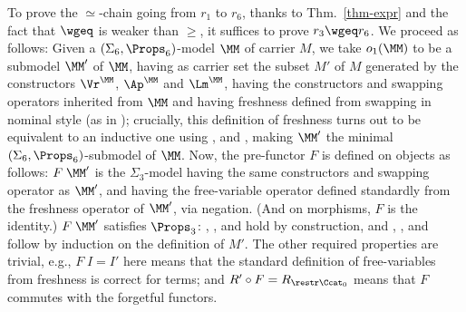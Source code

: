 To prove the $\simeq$-chain going from $r_1$ to $r_6$, 
%
thanks to Thm.~\ref{thm-expr} and the fact that $\wgeq$ is weaker than $\geq$, 
it suffices to prove $r_3 \wgeq r_6$.   
% 
%
We proceed as follows: Given a $(\Sigma_6,\Props_6)$-model $\MM$ of carrier $M$, we take $o_1(\MM)$ to be 
a submodel $\MM'$ of $\MM$, having as carrier set the subset $M'$ of $M$ generated by the constructors $\Vr^\MM$, $\Ap^\MM$ and $\Lm^\MM$, having the constructors and swapping operators inherited from $\MM$ and having freshness defined from swapping in nominal style (as in \FrDSw{}); crucially, this definition of freshness turns out to be equivalent to an inductive one using \FrVr{}, \FrAp{} and \FrLm{}, making $\MM'$ the minimal $(\Sigma_6,\Props_6)$-submodel of $\MM$. 
%
Now, the pre-functor $F$ is defined on objects as follows: $F\;\MM'$ 
is the $\Sigma_3$-model having the same constructors and swapping operator as $\MM'$, and having the free-variable operator defined standardly from the freshness operator of $\MM'$, via negation. (And on morphisms, $F$ is the identity.)   $F\;\MM'$ satisfies $\Props_3$: \SwVr{}, \SwAp{}, \SwLm{} and \FvDSw{} hold by construction, and \FCB{}, \SwId{}, \SwIv{} and \SwCp{} follow by induction on the definition of $M'$. The other required properties are trivial, e.g., $F\;I = I'$ here means that the standard definition of free-variables from freshness is correct for terms; and $R' \circ F = R_{\restr\Ccat_0}$ means that $F$ commutes with the forgetful functors. 
%
%

